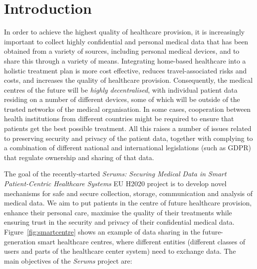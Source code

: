 \documentclass[sigconf]{acmart}
\begin{document}
%

%

%
\maketitle

\section{Introduction}

\noindent
In order to achieve the highest quality of healthcare provision, it is increasingly important to collect highly confidential and personal medical data that has been obtained from a variety of sources, including personal medical devices, and to share this through a variety of means. Integrating home-based healthcare into a holistic treatment plan is more cost effective, reduces travel-associated risks and costs, and increases the quality of healthcare provision. Consequently, the medical centres of the future will be \emph{highly decentralised}, with individual patient data residing on a number of different devices, some of which will be outside of the trusted networks of the medical organisation. In some cases, cooperation between health institutions from different countries might be required to ensure that patients get the best possible treatment. All this raises a number of issues related to preserving security and privacy of the patient data, together with complying to a combination of different national and international legislations (such as GDPR) that regulate ownership and sharing of that data.

The goal of the recently-started \emph{Serums: Securing Medical Data in Smart Patient-Centric Healthcare Systems} EU H2020 project is to develop novel mechanisms for safe and secure collection, storage, communication and analysis of medical data. We aim to put patients in the centre of future healthcare provision, enhance their personal care, maximise the quality of their treatments while ensuring trust in the security and privacy of their confidential medical data. Figure~\ref{fig:smartcentre} shows an example of data sharing in the future-generation smart healthcare centres, where different entities (different classes of users and parts of the healthcare center system) need to exchange data. The main objectives of the \emph{Serums} project are: 
\end{document}

